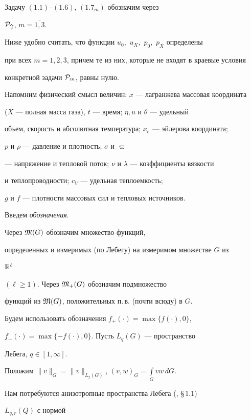 \documentclass[12pt]{article}
\theoremstyle{plain} %
\theoremstyle{definition}
\numberwithin{equation}{section}
\begin{document}
Задачу $(1.1)$--$(1.6)$, $(1.7_m)$ обозначим через


$\cal P_m$, $m=\overline{1,3}$.


Ниже удобно считать, что функции $u_0,$ $u_X,$ $p_0,$ $p_X$ определены


при всех $m=1,2,3$, причем те из них, которые не входят в краевые условия


конкретной задачи  ${\cal P}_m$, равны нулю.





Напомним физический смысл величин: $x$ --- лагранжева массовая координата


($X$ --- полная масса газа), $t$ --- время; $\eta,u$ и $\theta$ --- удельный


объем, скорость и абсолютная температура; $x_e$ --- эйлерова координата;


$p$ и $\rho$ --- давление и плотность;  $\sigma$ и $\varpi$


--- напряжение и тепловой поток; $\nu$ и $\lambda$ --- коэффициенты вязкости


и теплопроводности; $c_V$ --- удельная теплоемкость;


$g$ и $f$ --- плотности массовых сил и тепловых источников.





Введем {\it обозначения}.


Через $\frak M(G)$ обозначим множество функций,


определенных и измеримых (по Лебегу) на измеримом множестве $G$ из


$\Bbb R^{\ell}$


$(\ell\ge 1).$ Через  $\frak M_+(G)$ обозначим подмножество


функций из $\frak M(G)$, положительных п.\,в. (почти всюду) в $G$.


Будем использовать обозначения  $f_+(\cdot)=\max\{f(\cdot),0\}$,


$f_-(\cdot)=\max\{-f(\cdot),0\}$. Пусть $L_q(G)$ --- пространство


Лебега, $q\in [1,\infty]$.


Положим $\|v\|_G=\|v\|_{L_2(G)}$, $(v,w)_G=\int\limits_G vw\,dG.$





Нам потребуются  анизотропные пространства Лебега (\cite{Be}, \S\,1.1)


$L_{q,r}(Q)$ с нормой
\end{document}
